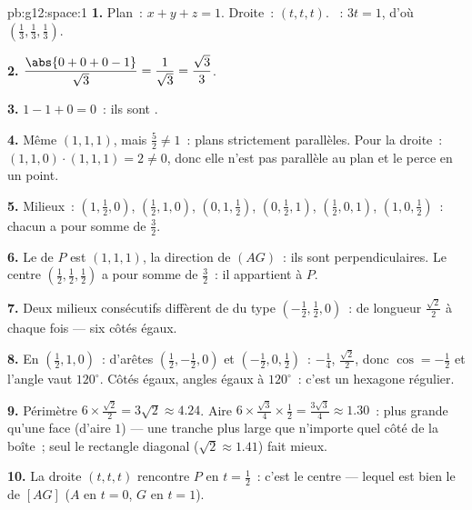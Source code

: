 \begin{solution}{pb:g12:space:1}
\textbf{1.} Plan~: $x + y + z = 1$. Droite~: $(t, t, t)$.
~: $3t = 1$, d'où
$\left(\frac13, \frac13, \frac13\right)$.

\textbf{2.} $\dfrac{\abs{0 + 0 + 0 - 1}}{\sqrt3} =
\dfrac{1}{\sqrt3} = \dfrac{\sqrt3}{3}$.

\textbf{3.} $1 - 1 + 0 = 0$~: ils sont .

\textbf{4.} Même  $(1,1,1)$, mais
$\frac52 \neq 1$~: plans strictement parallèles. Pour la droite~:
$(1,1,0) \cdot (1,1,1) = 2 \neq 0$, donc elle n'est pas parallèle
au plan et le perce en un point.

\textbf{5.} Milieux~: $\left(1, \frac12, 0\right)$,
$\left(\frac12, 1, 0\right)$, $\left(0, 1, \frac12\right)$,
$\left(0, \frac12, 1\right)$, $\left(\frac12, 0, 1\right)$,
$\left(1, 0, \frac12\right)$~: chacun a pour somme de 
$\frac32$.

\textbf{6.} Le  de $P$ est $(1,1,1)$, la direction de
$(AG)$~: ils sont perpendiculaires. Le centre
$\left(\frac12,\frac12,\frac12\right)$ a pour somme de 
$\frac32$~: il appartient à $P$.

\textbf{7.} Deux milieux consécutifs diffèrent de  du type
$\left(-\frac12, \frac12, 0\right)$~: de longueur
$\frac{\sqrt2}{2}$ à chaque fois --- six côtés égaux.

\textbf{8.} En $\left(\frac12, 1, 0\right)$~:  d'arêtes
$\left(\frac12, -\frac12, 0\right)$ et
$\left(-\frac12, 0, \frac12\right)$~: 
$-\frac14$,  $\frac{\sqrt2}{2}$, donc
$\cos = -\frac12$ et l'angle vaut $120^\circ$. Côtés égaux, angles
égaux à $120^\circ$~: c'est un hexagone régulier.

\textbf{9.} Périmètre $6 \times \frac{\sqrt2}{2} = 3\sqrt2
\approx 4.24$. Aire $6 \times \frac{\sqrt3}{4} \times
\frac12 = \frac{3\sqrt3}{4} \approx 1.30$~: plus grande qu'une face
(d'aire $1$) --- une tranche plus large que n'importe quel côté de
la boîte~; seul le rectangle diagonal ($\sqrt2 \approx 1.41$) fait
mieux.

\textbf{10.} La droite $(t,t,t)$ rencontre $P$ en $t = \frac12$~:
c'est le centre --- lequel est bien le  de $[AG]$ ($A$ en
$t = 0$, $G$ en $t = 1$).


\end{solution}
